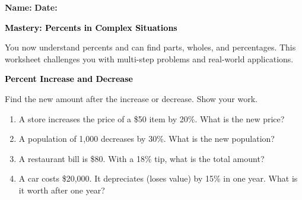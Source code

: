 \documentclass[12pt, letterpaper, fleqn]{article}
\begin{document}
\textbf{Name:} \underline{\hspace{5cm}}
\hfill
\textbf{Date:} \underline{\hspace{3cm}}\\

\begin{tcolorbox}[colback=customteal!20]
    \large\textcolor{black}{\textbf{Mastery: Percents in Complex Situations}}
\end{tcolorbox}

\vspace{3mm}

\noindent
You now understand percents and can find parts, wholes, and percentages. This worksheet challenges you with multi-step problems and real-world applications.

\vspace{4mm}

\begin{tcolorbox}[colback=customteal!20]
\large\textcolor{black}{\textbf{Percent Increase and Decrease}}
\end{tcolorbox}

\noindent
Find the new amount after the increase or decrease. Show your work.

\vspace{3mm}

\begin{enumerate}[itemsep=1cm, leftmargin=0.6cm]

\item A store increases the price of a \$50 item by 20\%. What is the new price?

\vspace{1.8cm}

\item A population of 1,000 decreases by 30\%. What is the new population?

\vspace{1.8cm}

\item A restaurant bill is \$80. With a 18\% tip, what is the total amount?

\vspace{1.8cm}

\item A car costs \$20,000. It depreciates (loses value) by 15\% in one year. What is it worth after one year?

\vspace{1.8cm}


\end{enumerate}
\end{document}
